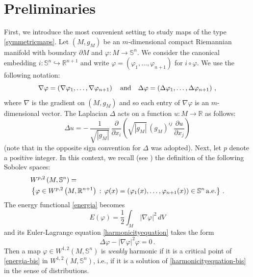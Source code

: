 \documentclass[11pt]{amsart}
\theoremstyle{plain}
\theoremstyle{definition}
\numberwithin{equation}{section}
\def \R{{\mathbb R}}
\def \s{{\mathbb S}}
\numberwithin{equation}{section}
\begin{document}
\section{Preliminaries}\label{preliminaries}
First, we introduce the most convenient setting to study maps of the type \eqref{symmetricmaps}. Let $(M,g_M)$ be an $m$-dimensional compact Riemannian manifold with boundary $\partial M$ and $\varphi : M \to \s^n$. We consider the canonical embedding $i: \s^n  \hookrightarrow \R^{n+1}$ and write $\varphi=\left (\varphi_1,\ldots,\varphi_{n+1}\right )$ for $i \circ \varphi$. We use the following notation:
\begin{equation}\label{gradiente-Laplaciano}
\nabla \varphi= \left (\nabla \varphi_1,\ldots, \nabla \varphi_{n+1} \right )\quad {\rm and}
\quad \Delta \varphi= \left (\Delta \varphi_1,\ldots, \Delta \varphi_{n+1} \right )\,,
\end{equation}
where $\nabla$ is the gradient on $(M,g_M)$ and so each entry of $\nabla \varphi$ is an $m$-dimensional vector. The Laplacian $\Delta$ acts on a function $u:M\to \R$ as follows: 
\begin{equation}\label{Laplacian-local-coordinates}
 \Delta u = -\,\frac{1}{\sqrt{|g_M|}} \, \frac{\partial}{\partial x_i}\left(\sqrt{|g_M|}\,(g_M)^{ij}\, \frac{\partial u}{\partial x_j} \right )
\end{equation}
(note that in \cite{FMR, Saliba} the opposite sign convention for $\Delta$ was adopted).
Next, let $p$ denote a positive integer. In this context, we recall (see \cite{Aubin, Hebey}) the definition of the following Sobolev spaces: 
\begin{equation}\label{Sobolev-space}
\begin{split}
&W^{p,2}\left ( M,\s^n \right )=\\
&\left \{ \varphi \in W^{p,2}\left ( M,\R^{n+1} \right )\,: \, \varphi(x)=\left (\varphi_1(x),\ldots,\varphi_{n+1}(x)\right ) \in \s^n \,{\rm a.e.} \right \} \,.
\end{split}
\end{equation}
The energy functional \eqref{energia} becomes
\begin{equation}\label{energia-bis}
E(\varphi)=\frac{1}{2}\int_{M}\,|\nabla \varphi|^2\,dV
\end{equation}
and its Euler-Lagrange equation \eqref{harmonicityequation} takes the form
\begin{equation}\label{harmonicityequation-bis}
  \Delta \varphi - \left | \nabla \varphi \right |^2 \varphi =0 \, .
\end{equation}
Then a map $\varphi \in W^{1,2}\left ( M,\s^n \right )$ is \textit{weakly} harmonic  if it is a critical point of \eqref{energia-bis} in $W^{1,2}\left ( M,\s^n \right )$, i.e., if it is a solution of \eqref{harmonicityequation-bis} in the sense of distributions. 
\end{document}
